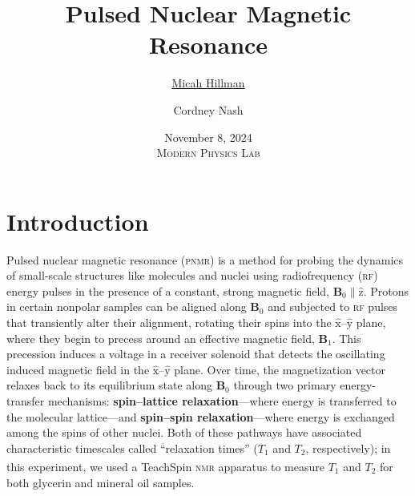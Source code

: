 \documentclass[12pt]{report}
\title{\textbf{Pulsed Nuclear Magnetic Resonance} \\\vspace{-0.6cm}}
\date{
    November 8, 2024 \\\vspace{0.5cm}
    \large{\textsc{Modern Physics Lab}}
}
\author{
    \ul{Micah Hillman} \and Cordney Nash
}
\begin{document}
\maketitle

\section*{Introduction}
{
    Pulsed nuclear magnetic resonance (\textsc{pnmr}) is a method for probing the dynamics of small-scale structures like molecules and nuclei using radiofrequency (\textsc{rf}) energy pulses in the presence of a constant, strong magnetic field, $\bm{B}_0 \parallel \hat{\mathrm{z}}$. Protons in certain nonpolar samples can be aligned along $\bm{B}_0$ and subjected to \textsc{rf} pulses that transiently alter their alignment, rotating their spins into the $\hat{\mathrm{x}}$–$\hat{\mathrm{y}}$ plane, where they begin to precess around an effective magnetic field, $\bm{B}_1$. This precession induces a voltage in a receiver solenoid that detects the oscillating induced magnetic field in the $\hat{\mathrm{x}}$–$\hat{\mathrm{y}}$ plane. Over time, the magnetization vector relaxes back to its equilibrium state along $\bm{B}_0$ through two primary energy-transfer mechanisms: \textbf{spin–lattice relaxation}—where energy is transferred to the molecular lattice—and \textbf{spin–spin relaxation}—where energy is exchanged among the spins of other nuclei. Both of these pathways have associated characteristic timescales called ``relaxation times'' ($T_1$ and $T_2$, respectively); in this experiment, we used a TeachSpin\textsuperscript{\tiny\textregistered} \textsc{nmr} apparatus to measure $T_1$ and $T_2$ for both glycerin and mineral oil samples.
}
\end{document}
